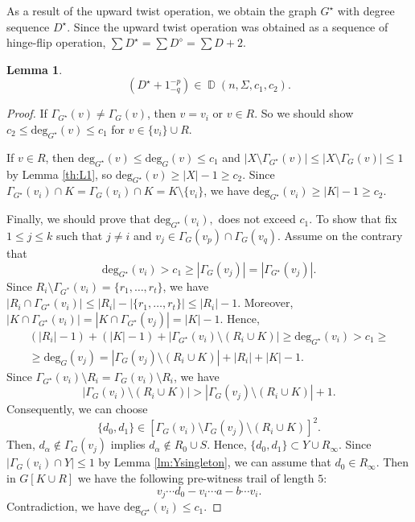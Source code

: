 \documentclass[11pt]{elsarticle}
\theoremstyle{plain}
\newtheorem{lemma}[theorem]{Lemma}
\theoremstyle{definition}
\def\deg{\mathrm{deg}}
\newcommand{\dds}[4]{\operatorname{\mathbb D}(#1,#2,#3,#4)}
\begin{document}
As a result of the upward twist operation, we obtain the  graph $G^\star$ with degree sequence $D^\star$. Since the upward twist operation was  obtained as a sequence of hinge-flip operation, $\sum D^\star=\sum D^\diamond=\sum D+2$.


\begin{lemma}\label{th:Sou-5}
\begin{equation}\label{eq:Sou-4}
\left (D^\star + 1_{-q}^{-p}\right ) \in \dds{n}{\Sigma}{c_1}{c_2}.
\end{equation}
\end{lemma}
\begin{proof}
If $\Gamma_{G^\star}(v)\ne\Gamma_G(v)$, then $v=v_i$ or $v\in R$. So we should show $c_2\le \deg_{G^\star}(v)\le c_1$ for $v\in \{v_i\}\cup R$.


If $v\in R$, then $\deg_{G^\star}(v)\le\deg_{G}(v)\le c_1$ and
$|X\setminus \Gamma_{G^\star}(v)|\le |X\setminus \Gamma_{G}(v)|\le 1$  by Lemma \ref{th:L1}, so  $\deg_{G^\star}(v)\ge |X|-1\ge c_2$. Since $\Gamma_{G^\star}(v_i)\cap K=\Gamma_{G}(v_i)\cap K=K\setminus \{v_i\}$, we have $\deg_{G^\star}(v_i)\ge |K|-1\ge c_2$.

Finally,  we should prove that  $\deg_{G^\star}(v_i),$  does not exceed $c_1.$ To show that fix  $1\le j \le k$ such that $j\ne i$ and $v_j\in \Gamma_G(v_p)\cap \Gamma_G(v_q)$.   Assume on the contrary that
\begin{displaymath}
\deg_{G^\star}(v_i)> c_1 \ge |\Gamma_{G}(v_j)|=|\Gamma_{G^\star}(v_j)|.
\end{displaymath}
Since  $R_i\setminus \Gamma_{G^*}(v_i)=\{r_1,\dots, r_t\}$, we have
$|R_i\cap  \Gamma_{G^\star}(v_i)|\le |R_i|-|\{r_1,\dots, r_t\}|   \le    |R_i|-1$. Moreover, $|K\cap  \Gamma_{G^\star}(v_i)|=|K\cap  \Gamma_{G^\star}(v_j)|=|K|-1$. Hence,
\begin{multline*}
\left( |R_i|-1 \right) + (|K|-1)  + |\Gamma_{G^\star}(v_i)\setminus (R_i\cup K)| \ge \deg_{G^\star}(v_i) > c_1\ge  \\
\ge \deg_G(v_j)=  |\Gamma_{G}(v_j)\setminus (R_i\cup K)| + |R_i|+|K|-1.
\end{multline*}
Since  $\Gamma_{G^\star}(v_i)\setminus R_i=\Gamma_{G}(v_i)\setminus R_i$,
we have
\begin{displaymath}
|\Gamma_{G}(v_i)\setminus (R_i\cup K)|> |\Gamma_{G}(v_j)\setminus (R_i\cup K)|+1.
\end{displaymath}
 Consequently, we can choose
 \begin{displaymath}
 \{d_0,d_1\}\in [\Gamma_{G}(v_i)\setminus \Gamma_{G}(v_j) \setminus (R_i\cup K)]^2.
 \end{displaymath}
Then, $d_{\alpha}\notin \Gamma_{G}(v_j)$ implies $d_{\alpha}\notin R_0\cup S$. Hence, $\{d_0,d_1\}\subset Y\cup R_{\infty}$. Since $|\Gamma_G(v_i)\cap Y|\le 1$  by Lemma \ref{lm:Ysingleton}, we can assume that $d_0\in R_\infty$. Then in $G[K\cup R]$ we have  the following pre-witness trail of length $5$:
\begin{displaymath}
v_j\cdots d_0-v_i\cdots a-b\cdots v_i.
\end{displaymath}
Contradiction, we have $\deg_{G^\star}(v_i)\le c_1$.
\end{proof}
\end{document}
